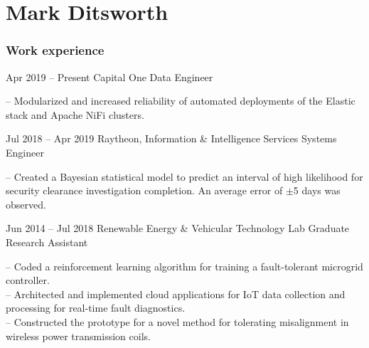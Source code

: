 \documentclass{tccv}
\begin{document}
\part{Mark Ditsworth}

\section{Work experience}

\begin{eventlist}

\item{Apr 2019 -- Present}
    {Capital One}
    {Data Engineer}
    
-- Modularized and increased reliability of automated deployments of the Elastic stack and Apache NiFi clusters.

\item{Jul 2018 -- Apr 2019}
    {Raytheon, Information \& Intelligence Services}
    {Systems Engineer}
    
-- Created a Bayesian statistical model to predict an interval of high
likelihood for security clearance investigation completion. An average
error of $\pm$5 days was observed.

\item{Jun 2014 -- Jul 2018}
     {Renewable Energy \& Vehicular Technology Lab}
     {Graduate Research Assistant}

-- Coded a reinforcement learning algorithm for training a fault-tolerant
microgrid controller.\\
-- Architected and implemented cloud applications for IoT data collection
and processing for real-time fault diagnostics.\\
-- Constructed the prototype for a novel method for tolerating misalignment in wireless power transmission coils.

%

\end{eventlist}
\vspace{-12pt}
\end{document}
